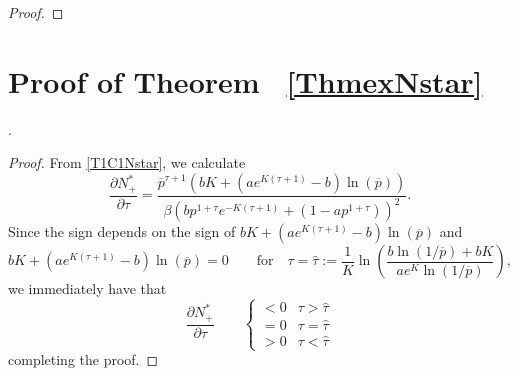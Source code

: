 \documentclass{article}
\numberwithin{theorem}{section}
\begin{document}
{\begin{proof}
\end{proof}


\section{Proof of Theorem ~\ref{ThmexNstar}}\label{proofThmexNstar}. 

\begin{proof}
From \eqref{T1C1Nstar}, we calculate
\begin{equation*}
    \frac{\partial N^*_+}{\partial \tau}
    =\frac{\overline{p}^{\tau+1} (b K+ (ae^{K(\tau+1)} -b)\ln(\overline{p}))}{\beta (b p^{
    1 + \tau} e^{-K(\tau+1)} +  (1 - a p^{1 + \tau}))^2}.
    \end{equation*}
Since the sign depends on the sign of $b K+ (ae^{K(\tau+1)} -b)\ln(\overline{p})$ and 
$$b K+ (ae^{K(\tau+1)} -b)\ln(\overline{p})=0\qquad \mbox{for} \quad \tau=\hat{\tau}:=\frac{1}{K}\ln\left( \frac{b\ln(1/\overline{p})+bK}{ae^{K}\ln(1/\overline{p})}  \right),$$
we immediately have that 
\begin{equation*}
  \frac{\partial N^*_+}{\partial \tau}\qquad    
\begin{cases} 
<0 & \tau>\widehat{\tau}\\
=0 & \tau=\widehat{\tau}\\
>0& \tau<\widehat{\tau}
    \end{cases}
\end{equation*}
completing the proof.
\end{proof}




}
\end{document}
